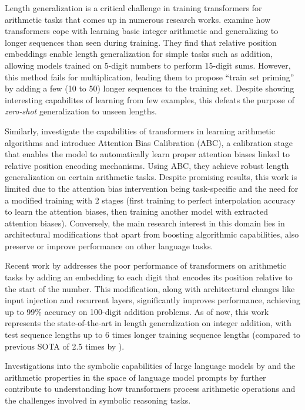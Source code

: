 Length generalization is a critical challenge in training transformers for arithmetic tasks that comes up in numerous research works. \cite{jelassi_length_2023} examine how transformers cope with learning basic integer arithmetic and generalizing to longer sequences than seen during training. They find that relative position embeddings enable length generalization for simple tasks such as addition, allowing models trained on 5-digit numbers to perform 15-digit sums. However, this method fails for multiplication, leading them to propose ``train set priming'' by adding a few (10 to 50) longer sequences to the training set. Despite showing interesting capabilites of learning from few examples, this defeats the purpose of \emph{zero-shot} generalization to unseen lengths.

Similarly, \cite{duan_interpolation_2023} investigate the capabilities of transformers in learning arithmetic algorithms and introduce Attention Bias Calibration (ABC), a calibration stage that enables the model to automatically learn proper attention biases linked to relative position encoding mechanisms. Using ABC, they achieve robust length generalization on certain arithmetic tasks. Despite promising results, this work is limited due to the attention bias intervention being task-specific and the need for a modified training with 2 stages (first training to perfect interpolation accuracy to learn the attention biases, then training another model with extracted attention biases). Conversely, the main research interest  in this domain lies in architectural modifications that apart from boosting algorithmic capabilities, also preserve or improve performance on other language tasks.

Recent work by \cite{mcleish_transformers_2024} addresses the poor performance of transformers on arithmetic tasks by adding an embedding to each digit that encodes its position relative to the start of the number. This modification, along with architectural changes like input injection and recurrent layers, significantly improves performance, achieving up to 99\% accuracy on 100-digit addition problems. As of now, this work represents the state-of-the-art in length generalization on integer addition, with test sequence lengths up to 6 times longer training sequence lengths (compared to previous SOTA of 2.5 times by \cite{zhou_transformers_2024}).

Investigations into the symbolic capabilities of large language models by \cite{dave_investigating_2024} and the arithmetic properties in the space of language model prompts by \cite{krubinski_basic_2023} further contribute to understanding how transformers process arithmetic operations and the challenges involved in symbolic reasoning tasks.

